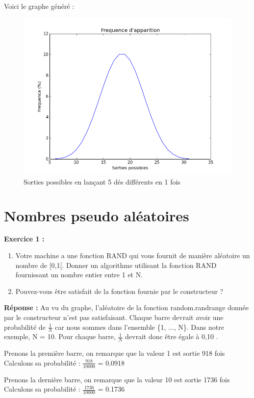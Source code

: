 \documentclass[oneside]{book}
\begin{document}
Voici le graphe généré : 
\begin{figure}[h!]
	\centering
	\includegraphics[width=\textwidth]{lancer_de_5_des.png}
	\caption{Sorties possibles en lançant 5 dés différents en 1 fois}
\end{figure}
\section{Nombres pseudo aléatoires}
\textbf{Exercice 1 :}
\begin{enumerate}
	\item Votre machine a une fonction RAND qui vous fournit de manière aléatoire un nombre de [0,1[. Donner un algorithme utilisant la fonction RAND fournissant un nombre entier entre 1 et N.
	\item Pouvez-vous être satisfait de la fonction fournie par le constructeur ?
\end{enumerate}

\textbf{Réponse :} 
Au vu du graphe, l'aléatoire de la fonction random.randrange donnée par le constructeur n'est pas satisfaisant. Chaque barre devrait avoir une probabilité de $\frac{1}{N}$ car nous sommes dans l'ensemble \{1, ..., N\}. Dans notre exemple, N = 10. Pour chaque barre, $\frac{1}{N}$ devrait donc être égale à 0,10 .

Prenons la première barre, on remarque que la valeur 1 est sortie 918 fois Calculons sa probabilité : $\frac{918}{10000}$ = 0.0918

Prenons la dernière barre, on remarque que la valeur 10 est sortie 1736 fois Calculons sa probabilité : $\frac{1736}{10000}$ = 0.1736
\end{document}
